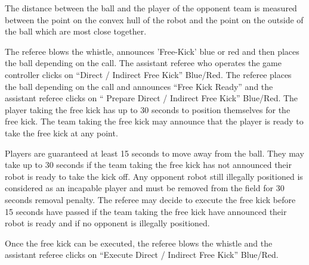 The distance between the ball and the player of the opponent team is measured between the point on the convex hull of the robot and the point on the outside of the ball which are most close together.

\color{black}


The referee blows the whistle, announces 'Free-Kick' blue or red and then places
the ball depending on the call.
The assistant referee who operates the game controller clicks on
``Direct / Indirect Free Kick'' Blue/Red.
The referee places the ball depending on the call and announces
``Free Kick Ready'' and the assistant referee clicks on
`` Prepare Direct / Indirect Free Kick'' Blue/Red.
The player taking the free kick has up to 30 seconds to position themselves for
the free kick.
The team taking the free kick may announce that the player is ready to take the
free kick at any point.

Players are guaranteed at least 15 seconds to move away from the ball.
They may take up to 30 seconds if the team taking the free kick has not announced
their robot is ready to take the kick off.
Any opponent robot still illegally positioned is considered as an incapable
player and must be removed from the field for 30 seconds removal penalty.
The referee may decide to execute the free kick before 15 seconds have passed if
the team taking the free kick have announced their robot is ready and if no
opponent is illegally positioned.

Once the free kick can be executed, the referee blows the whistle and the
assistant referee clicks on ``Execute Direct / Indirect Free Kick'' Blue/Red.


